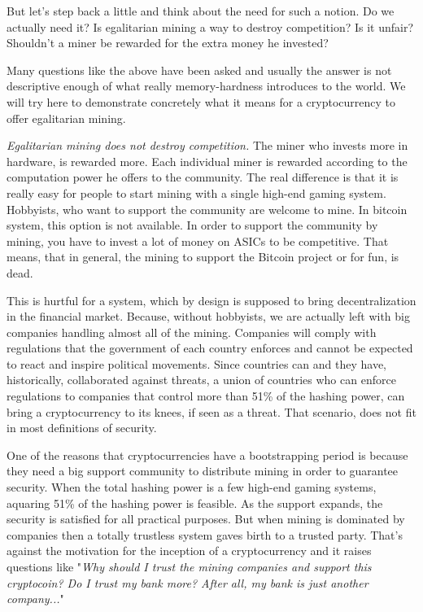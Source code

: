 But let's step back a little and think about the need for such a notion. Do we actually need it? Is egalitarian mining a way to destroy competition? Is it unfair? Shouldn't a miner be rewarded for the extra money he invested?

Many questions like the above have been asked and usually the answer is not descriptive enough of what really memory-hardness introduces to the world. We will try here to demonstrate concretely what it means for a cryptocurrency to offer egalitarian mining.

\emph{Egalitarian mining does not destroy competition.} The miner who invests more in hardware, is rewarded more. Each individual miner is rewarded according to the computation power he offers to the community. The real difference is that it is really easy for people to start mining with a single high-end gaming system. Hobbyists, who want to support the community are welcome to mine. In bitcoin system, this option is not available. In order to support the community by mining, you have to invest a lot of money on ASICs to be competitive. That means, that in general, the mining to support the Bitcoin project or for fun, is dead.

This is hurtful for a system, which by design is supposed to bring decentralization in the financial market. Because, without hobbyists, we are actually left with big companies handling almost all of the mining. Companies will comply with regulations that the government of each country enforces and cannot be expected to react and inspire political movements. Since countries can and they have, historically, collaborated against threats, a union of countries who can enforce regulations to companies that control more than 51\% of the hashing power, can bring a cryptocurrency to its knees, if seen as a threat. That scenario, does not fit in most definitions of security.

One of the reasons that cryptocurrencies have a bootstrapping period is because they need a big support community to distribute mining in order to guarantee security. When the total hashing power is a few high-end gaming systems, aquaring 51\% of the hashing power is feasible. As the support expands, the security is satisfied for all practical purposes. But when mining is dominated by companies then a totally trustless system gaves birth to a trusted party. That's against the motivation for the inception of a cryptocurrency and it raises questions like "\emph{Why should I trust the mining companies and support this cryptocoin? Do I trust my bank more? After all, my bank is just another company...}"

